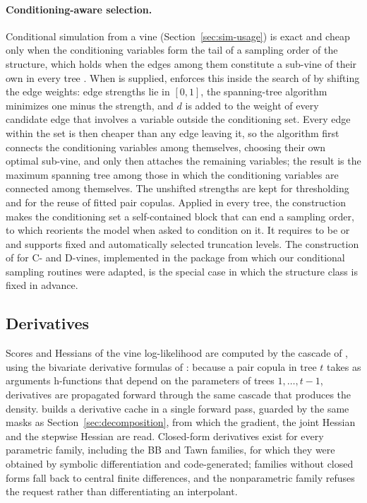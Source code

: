 \documentclass[article]{jss}
\begin{document}
\paragraph{Conditioning-aware selection.}  Conditional simulation from a vine
(Section~\ref{sec:sim-usage}) is exact and cheap only when the conditioning
variables form the tail of a sampling order of the structure, which holds when
the edges among them constitute a sub-vine of their own in every tree
\citep{cooke2015}.  When  is supplied,
 enforces this inside the search of \citet{dissmann2013} by
shifting the edge weights: edge strengths lie in $[0, 1]$, the spanning-tree
algorithm minimizes one minus the strength, and $d$ is added to the weight of
every candidate edge that involves a variable outside the conditioning set.
Every edge within the set is then cheaper than any edge leaving it, so the
algorithm first connects the conditioning variables among themselves,
choosing their own optimal sub-vine, and only then attaches the remaining
variables; the result is the maximum spanning tree among those in which the
conditioning variables are connected among themselves.  The unshifted
strengths are kept for thresholding and for the reuse of fitted pair copulas.
Applied in every tree, the construction makes the conditioning set a
self-contained block that can end a sampling order, to which
 reorients the model when asked to condition on it.  It
requires  to be  or
 and supports fixed and automatically selected
truncation levels.  The construction of \citet{bevacqua2017} for C- and
D-vines, implemented in the  package 
\citep{claassen2024} from which our conditional sampling routines were
adapted, is the special case in which the structure class is fixed in
advance.

\subsection{Derivatives}\label{sec:deriv-engine}

Scores and Hessians of the vine log-likelihood are computed by the cascade of
\citet{stober2013}, using the bivariate derivative formulas of
\citet{schepsmeier2014}: because a pair copula in tree $t$ takes as arguments
h-functions that depend on the parameters of trees $1, \dots, t-1$,
derivatives are propagated forward through the same cascade that produces the
density.   builds a derivative cache in a single forward
pass, guarded by the same masks as Section~\ref{sec:decomposition}, from
which the gradient, the joint Hessian and the stepwise Hessian are read.
Closed-form derivatives exist for every parametric family, including the BB
and Tawn families, for which they were obtained by symbolic differentiation
and code-generated; families without closed forms fall back to central finite
differences, and the nonparametric family refuses the request rather than
differentiating an interpolant.
\end{document}
